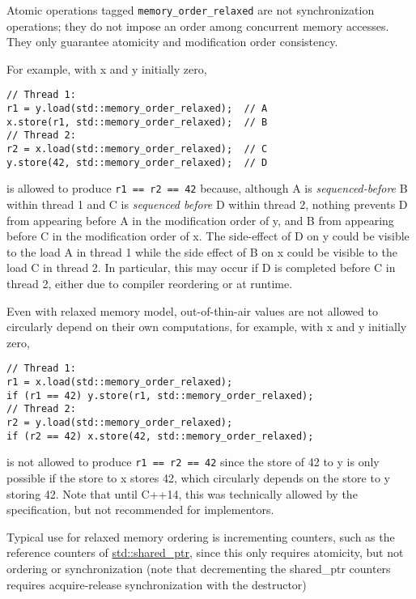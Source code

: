 \documentclass[a4paper,12pt,notitlepage,twoside,openright]{article}
\begin{document}
Atomic operations tagged \texttt{memory\_order\_relaxed} are not synchronization
operations; they do not impose an order among concurrent memory
accesses. They only guarantee atomicity and modification order
consistency.

For example, with x and y initially zero,

\begin{verbatim}
// Thread 1:
r1 = y.load(std::memory_order_relaxed);  // A
x.store(r1, std::memory_order_relaxed);  // B
// Thread 2:
r2 = x.load(std::memory_order_relaxed);  // C
y.store(42, std::memory_order_relaxed);  // D
\end{verbatim}

is allowed to produce \texttt{r1 == r2 == 42} because, although A is
\emph{sequenced-before} B within thread 1 and C is \emph{sequenced
before} D within thread 2, nothing prevents D from appearing before A in
the modification order of y, and B from appearing before C in the
modification order of x. The side-effect of D on y could be visible to
the load A in thread 1 while the side effect of B on x could be visible
to the load C in thread 2. In particular, this may occur if D is
completed before C in thread 2, either due to compiler reordering or at
runtime.

\begin{oframed}
\marginnote{\textcolor{ForestGreen}{since C++14}}
Even with relaxed memory model, out-of-thin-air values are not allowed
to circularly depend on their own computations, for example, with x and
y initially zero,

\begin{verbatim}
// Thread 1:
r1 = x.load(std::memory_order_relaxed);
if (r1 == 42) y.store(r1, std::memory_order_relaxed);
// Thread 2:
r2 = y.load(std::memory_order_relaxed);
if (r2 == 42) x.store(42, std::memory_order_relaxed);
\end{verbatim}

is not allowed to produce \texttt{r1 == r2 == 42} since the store of 42 to y is
only possible if the store to x stores 42, which circularly depends on
the store to y storing 42. Note that until C++14, this was technically
allowed by the specification, but not recommended for implementors.
\end{oframed}

Typical use for relaxed memory ordering is incrementing counters, such
as the reference counters of
\href{https://en.cppreference.com/w/cpp/memory/shared_ptr}{std::shared\_ptr},
since this only requires atomicity, but not ordering or synchronization
(note that decrementing the shared\_ptr counters requires
acquire-release synchronization with the destructor)
\end{document}
